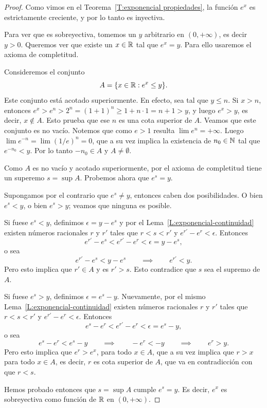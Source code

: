 \begin{proof}
    Como vimos en el Teorema~\ref{T:exponencial propiedades}, la función $e^x$ es estrictamente creciente, y por lo tanto es inyectiva. 
    
    Para ver que es sobreyectiva, tomemos un $y$ arbitrario en $(0,+\infty)$, es decir $y>0$. Queremos ver que existe un $x\in\mathbb{R}$ tal que $e^x = y$. Para ello usaremos el axioma de completitud.
    
    Consideremos el conjunto
    \[
    A = \{ x\in\mathbb{R} : e^x \le y\}.
    \]
    Este conjunto está acotado superiormente. En efecto, sea \niN tal que $y\le n$. Si $x>n$, entonces $e^x > e^n > 2^n = (1+1)^n \ge 1+n\cdot 1 = n+1 > y$, y luego $e^x>y$, es decir, $x \notin A$. Esto prueba que ese $n$ es una cota superior de $A$.
    Veamos que este conjunto es no vacío. Notemos que como $e>1$ resulta $\lim e^n = +\infty$. Luego $\lim e^{-n} = \lim (1/e)^n = 0$, que a su vez implica la existencia de $n_0 \in\mathbb{N}$ tal que $e^{-n_0} < y$. Por lo tanto $-n_0 \in A$ y $A\neq\emptyset$.

    Como $A$ es no vacío y acotado superiormente, por el axioma de completitud tiene un superemo $s = \sup A$.
    Probemos ahora que $e^s = y$.

    Supongamos por el contrario que $e^s \neq y$, entonces caben dos posibilidades. O bien $e^s < y$, o bien $e^s > y$; veamos que ninguna es posible.

    Si fuese $e^s < y$, definimos $\epsilon = y - e^s$ y por el Lema~\ref{L:exponencial-continuidad} existen números racionales $r$ y $r'$ tales que $r<s<r'$ y $e^{r'}-e^r<\epsilon$. Entonces
    \[
    e^{r'} - e^s < e^{r'} - e^r < \epsilon = y-e^s,
    \]
    o sea
    \[
    e^{r'} - e^s < y - e^s 
    \qquad\implies\qquad e^{r'} < y.
    \]
    Pero esto implica que $r'\in A$ y es $r' > s$. Esto contradice que $s$ sea el supremo de $A$.

    Si fuese $e^s > y$, definimos $\epsilon = e^s-y$. Nuevamente, por el mismo Lema~\ref{L:exponencial-continuidad} existen números racionales $r$ y $r'$ tales que $r<s<r'$ y $e^{r'}-e^r<\epsilon$. Entonces
    \[
    e^{s} - e^r < e^{r'} - e^r < \epsilon = e^s - y,
    \]
    o sea
    \[
    e^{s} - e^r < e^s - y 
    \qquad\implies\qquad -e^{r} < -y
    \qquad\implies\qquad e^{r} > y
    .
    \]
    Pero esto implica que $e^r > e^x$, para todo $x\in A$, que a su vez implica que $r > x$ para todo $x\in A$, es decir, $r$ es cota superior de $A$, que va en contradicción con que $r<s$. 

    Hemos probado entonces que $s = \sup A$ cumple $e^s = y$. Es decir, $e^x$ es sobreyectiva como función de $\mathbb{R}$ en $(0,+\infty)$.
\end{proof}

